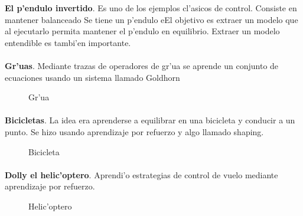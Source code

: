 \documentclass[11pt]{article}
\begin{document}
\medskip
\noindent

\textbf{El p'endulo invertido}. Es uno de los ejemplos cl'asicos de control. Consiste en mantener balanceado Se tiene un p'endulo eEl objetivo es extraer un modelo que al ejecutarlo permita mantener el p'endulo en equilibrio. Extraer un modelo entendible es tambi'en importante.~\cite{Suc99skillmodelling}~\cite{And99modellingof}~\cite{freyre}

\paragraph{}
\noindent
\textbf{Gr'uas}. Mediante trazas de operadores de gr'ua se aprende un conjunto de ecuaciones usando un sistema llamado Goldhorn

\begin{figure}[h]

\centering
{}
\caption[Gr'ua]{Gr'ua} 
\label{fig:grua}

\end{figure}

\paragraph{}
\noindent
\textbf{Bicicletas}. La idea era aprenderse a equilibrar en una bicicleta y conducir a un punto. Se hizo usando aprendizaje por refuerzo y algo llamado shaping.

\begin{figure}[h]

\centering
{}
\caption[Bicicleta]{Bicicleta} 
\label{fig:bici}

\end{figure}

\paragraph{}
\noindent
\textbf{Dolly el helic'optero}. Aprendi'o estrategias de control de vuelo mediante aprendizaje por refuerzo.

\begin{figure}[h]

\centering
{}
\caption[Helic'optero]{Helic'optero} 
\label{fig:helicoptero}

\end{figure}
\end{document}

